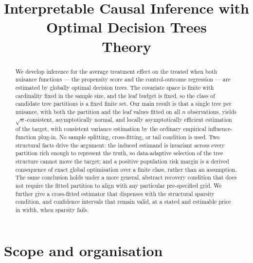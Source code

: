 \documentclass[11pt]{article}
\title{Interpretable Causal Inference with Optimal Decision Trees\\[2pt]
\large Theory}
\author{}
\date{}
\theoremstyle{plain}
\theoremstyle{definition}
\theoremstyle{remark}
\begin{document}
\maketitle

\begin{abstract}
We develop inference for the average treatment effect on the treated when both
nuisance functions --- the propensity score and the control-outcome regression
--- are estimated by globally optimal decision trees. The covariate space is
finite with cardinality fixed in the sample size, and the leaf budget is fixed,
so the class of candidate tree partitions is a fixed finite set. Our main result
is that a single tree per nuisance, with both the partition and the leaf values
fitted on all $n$ observations, yields $\sqrt n$-consistent, asymptotically
normal, and locally asymptotically efficient estimation of the target, with
consistent variance estimation by the ordinary empirical influence-function
plug-in. No sample splitting, cross-fitting, or tail condition is used. Two
structural facts drive the argument: the induced estimand is invariant across
every partition rich enough to represent the truth, so data-adaptive selection
of the tree structure cannot move the target; and a positive population risk
margin is a derived consequence of exact global optimisation over a finite
class, rather than an assumption. The same conclusion holds under a more
general, abstract recovery condition that does not require the fitted
partition to align with any particular pre-specified grid. We further give a
cross-fitted estimator that dispenses with the structural sparsity condition,
and confidence intervals that remain valid, at a stated and estimable price in
width, when sparsity fails.
\end{abstract}

\tableofcontents

\section{Scope and organisation}\label{sec:scope}
\end{document}
